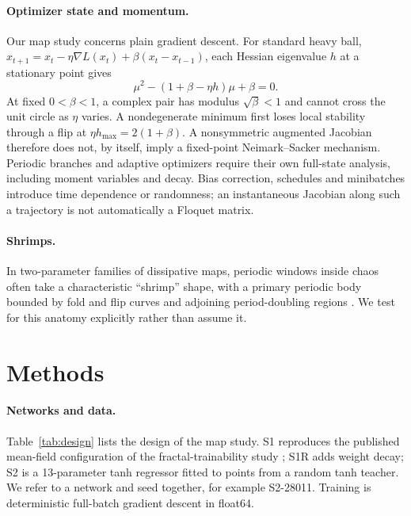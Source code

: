 \documentclass[11pt,letterpaper]{article}
\begin{document}
\paragraph{Optimizer state and momentum.} Our map study concerns plain gradient descent. For standard heavy ball,
$x_{t+1}=x_t-\eta\nabla L(x_t)+\beta(x_t-x_{t-1})$, each Hessian eigenvalue $h$ at a stationary point gives
\begin{equation}
\mu^2-(1+\beta-\eta h)\mu+\beta=0.
\end{equation}
At fixed $0<\beta<1$, a complex pair has modulus $\sqrt\beta<1$ and cannot cross the unit circle as $\eta$
varies. A nondegenerate minimum first loses local stability through a flip at
$\eta h_{\max}=2(1+\beta)$. A nonsymmetric augmented Jacobian therefore does not, by itself, imply a fixed-point
Neimark--Sacker mechanism. Periodic branches and adaptive optimizers require their own full-state analysis,
including moment variables and decay. Bias correction, schedules and minibatches introduce time dependence or
randomness; an instantaneous Jacobian along such a trajectory is not automatically a Floquet matrix.

\paragraph{Shrimps.} In two-parameter families of dissipative maps, periodic windows inside chaos often take a
characteristic ``shrimp'' shape, with a primary periodic body bounded by fold and flip curves and adjoining
period-doubling regions \citep{gallas1993,gallas1994}. We test for this
anatomy explicitly rather than assume it.

\section{Methods}
\label{sec:methods}



\paragraph{Networks and data.} Table~\ref{tab:design} lists the design of the map study. S1 reproduces the
published mean-field configuration of the fractal-trainability study \citep{sohldickstein2024}; S1R adds weight
decay; S2 is a 13-parameter tanh regressor fitted to points from a random tanh teacher. We refer to a network and
seed together, for example S2-28011. Training is deterministic full-batch gradient descent in float64.
\end{document}
